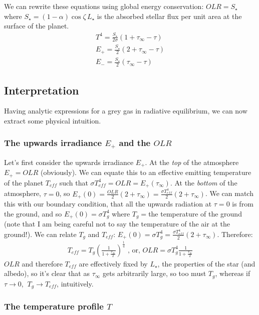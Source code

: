 We can rewrite these equations using global energy conservation: $OLR=S_\star$ where $S_\star=(1-\alpha)\cos\zeta\,L_\star$ is the absorbed stellar flux per unit area at the surface of the planet.
\begin{align}
    {T^4=\frac{S_\star}{2\sigma}(1+\tau_\infty-\tau)}\\
    {E_+=\frac{S_\star}{2}(2+\tau_\infty-\tau)}\\
    {E_-=\frac{S_\star}{2}(\tau_\infty-\tau)}
\end{align}

\subsection{Interpretation}

Having analytic expressions for a grey gas in radiative equilibrium, we can now extract some physical intuition. 

\subsubsection{The upwards irradiance $E_+$ and the $OLR$}

Let's first consider the upwards irradiance $E_+$. At the \textit{top} of the atmosphere $E_+=OLR$ (obviously). We can equate this to an effective emitting temperature of the planet $T_{eff}$ such that $\sigma T_{eff}^4=OLR=E_+(\tau_\infty)$. At the \textit{bottom} of the atmosphere, $\tau=0$, so $E_+(0)=\frac{OLR}{2}(2+\tau_\infty)=\frac{\sigma T_{eff}^4}{2}(2+\tau_\infty)$. We can match this with our boundary condition, that all the upwards radiation at $\tau=0$ is from the ground, and so $E_+(0)=\sigma T_g^4$ where $T_g=$the temperature of the ground (note that I am being careful not to say the temperature of the air at the ground!). We can relate $T_g$ and $T_{eff}$: $E_+(0)=\sigma T_{g}^4=\frac{\sigma T_{eff}^4}{2}(2+\tau_\infty)$. Therefore:
\begin{align*}
    T_{eff}=T_{g}\left(\frac{1}{1+\frac{\tau_\infty}{2}}\right)^\frac{1}{4} \,\,\text{, or,}\,\,
    OLR=\sigma T_g^4\frac{1}{1+\frac{\tau_\infty}{2}}
\end{align*}
$OLR$ and therefore $T_{eff}$ are effectively fixed by $L_\star$, the properties of the star (and albedo), so it's clear that as $\tau_\infty$ gets arbitrarily large, so too must $T_g$, whereas if $\tau\to0$, $\ T_g\to T_{eff}$, intuitively.

\subsubsection{The temperature profile $T$}

